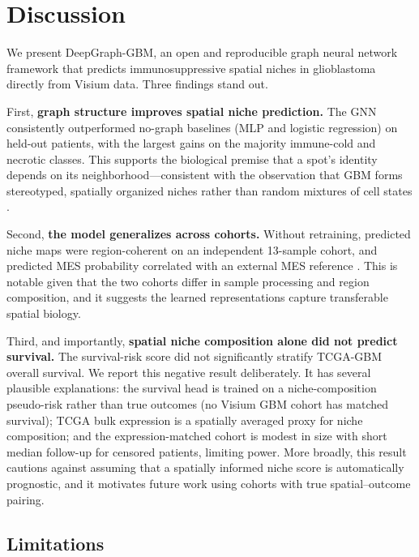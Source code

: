 \documentclass[11pt,letterpaper]{article}
\begin{document}
\section{Discussion}

We present DeepGraph-GBM, an open and reproducible graph neural network framework that predicts immunosuppressive spatial niches in glioblastoma directly from Visium data. Three findings stand out.

First, \textbf{graph structure improves spatial niche prediction.} The GNN consistently outperformed no-graph baselines (MLP and logistic regression) on held-out patients, with the largest gains on the majority immune-cold and necrotic classes. This supports the biological premise that a spot's identity depends on its neighborhood---consistent with the observation that GBM forms stereotyped, spatially organized niches rather than random mixtures of cell states \cite{greenwald2024,ravi2022}.

Second, \textbf{the model generalizes across cohorts.} Without retraining, predicted niche maps were region-coherent on an independent 13-sample cohort, and predicted MES probability correlated with an external MES reference \cite{neftel2019,greenwald2024}. This is notable given that the two cohorts differ in sample processing and region composition, and it suggests the learned representations capture transferable spatial biology.

Third, and importantly, \textbf{spatial niche composition alone did not predict survival.} The survival-risk score did not significantly stratify TCGA-GBM overall survival. We report this negative result deliberately. It has several plausible explanations: the survival head is trained on a niche-composition pseudo-risk rather than true outcomes (no Visium GBM cohort has matched survival); TCGA bulk expression is a spatially averaged proxy for niche composition; and the expression-matched cohort is modest in size with short median follow-up for censored patients, limiting power. More broadly, this result cautions against assuming that a spatially informed niche score is automatically prognostic, and it motivates future work using cohorts with true spatial--outcome pairing.

\subsection{Limitations}
\end{document}
